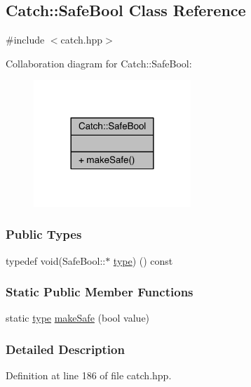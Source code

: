\hypertarget{a00070}{}\subsection{Catch\+:\+:Safe\+Bool Class Reference}
\label{a00070}


{\ttfamily \#include $<$catch.\+hpp$>$}



Collaboration diagram for Catch\+:\+:Safe\+Bool\+:\nopagebreak
\begin{figure}[H]
\begin{center}
\leavevmode
\includegraphics[width=168pt]{a00257}
\end{center}
\end{figure}
\subsubsection*{Public Types}
\begin{DoxyCompactItemize}
\item 
typedef void(Safe\+Bool\+::$\ast$ \hyperlink{a00070_a852cdacb020a98edeee0f4da4cf790d5}{type}) () const 
\end{DoxyCompactItemize}
\subsubsection*{Static Public Member Functions}
\begin{DoxyCompactItemize}
\item 
static \hyperlink{a00070_a852cdacb020a98edeee0f4da4cf790d5}{type} \hyperlink{a00070_af0ea63d9820f8bf7a8b76377913c4e77}{make\+Safe} (bool value)
\end{DoxyCompactItemize}


\subsubsection{Detailed Description}


Definition at line 186 of file catch.\+hpp.



